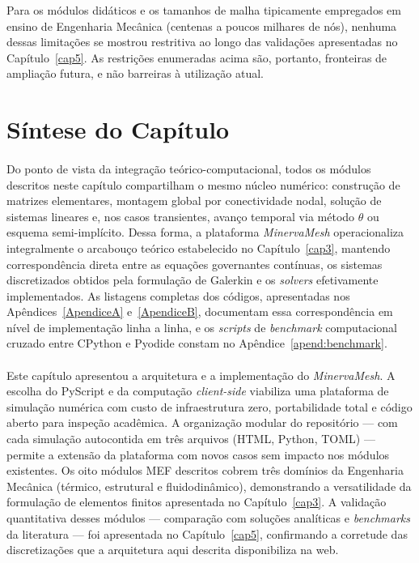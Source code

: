 Para os módulos didáticos e os tamanhos de malha tipicamente empregados em ensino de Engenharia Mecânica (centenas a poucos milhares de nós), nenhuma dessas limitações se mostrou restritiva ao longo das validações apresentadas no Capítulo~\ref{cap5}. As restrições enumeradas acima são, portanto, fronteiras de ampliação futura, e não barreiras à utilização atual.

\section{Síntese do Capítulo}
\label{sec:sintese_arquitetura}

\paragraph{}Do ponto de vista da integração teórico-computacional, todos os módulos descritos neste capítulo compartilham o mesmo núcleo numérico: construção de matrizes elementares, montagem global por conectividade nodal, solução de sistemas lineares e, nos casos transientes, avanço temporal via método $\theta$ ou esquema semi-implícito. Dessa forma, a plataforma \textit{MinervaMesh} operacionaliza integralmente o arcabouço teórico estabelecido no Capítulo~\ref{cap3}, mantendo correspondência direta entre as equações governantes contínuas, os sistemas discretizados obtidos pela formulação de Galerkin e os \textit{solvers} efetivamente implementados. As listagens completas dos códigos, apresentadas nos Apêndices~\ref{ApendiceA} e~\ref{ApendiceB}, documentam essa correspondência em nível de implementação linha a linha, e os \textit{scripts} de \textit{benchmark} computacional cruzado entre CPython e Pyodide constam no Apêndice~\ref{apend:benchmark}.

\paragraph{}Este capítulo apresentou a arquitetura e a implementação do \textit{MinervaMesh}. A escolha do PyScript e da computação \textit{client-side} viabiliza uma plataforma de simulação numérica com custo de infraestrutura zero, portabilidade total e código aberto para inspeção acadêmica. A organização modular do repositório --- com cada simulação autocontida em três arquivos (HTML, Python, TOML) --- permite a extensão da plataforma com novos casos sem impacto nos módulos existentes. Os oito módulos MEF descritos cobrem três domínios da Engenharia Mecânica (térmico, estrutural e fluidodinâmico), demonstrando a versatilidade da formulação de elementos finitos apresentada no Capítulo~\ref{cap3}. A validação quantitativa desses módulos --- comparação com soluções analíticas e \textit{benchmarks} da literatura --- foi apresentada no Capítulo~\ref{cap5}, confirmando a corretude das discretizações que a arquitetura aqui descrita disponibiliza na web.
